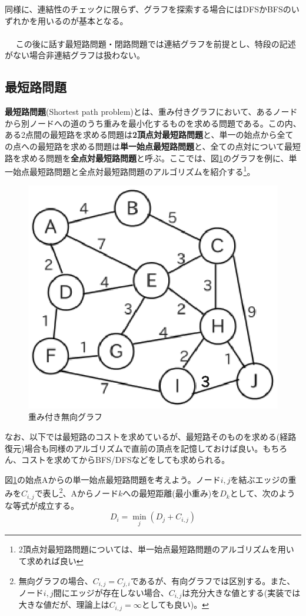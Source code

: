 同様に、連結性のチェックに限らず、グラフを探索する場合にはDFSかBFSのいずれかを用いるのが基本となる。
\\ \\　
この後に話す最短路問題・閉路問題では連結グラフを前提とし、特段の記述がない場合非連結グラフは扱わない。

\subsection{最短路問題}
\textbf{最短路問題}(Shortest path problem)とは、重み付きグラフにおいて、あるノードから別ノードへの道のうち重みを最小化するものを求める問題である。この内、ある2点間の最短路を求める問題は\textbf{2頂点対最短路問題}と、単一の始点から全ての点への最短路を求める問題は\textbf{単一始点最短路問題}と、全ての点対について最短路を求める問題を\textbf{全点対最短路問題}と呼ぶ。ここでは、図\ref{shortest}のグラフを例に、単一始点最短路問題と全点対最短路問題のアルゴリズムを紹介する\footnote{2頂点対最短路問題については、単一始点最短路問題のアルゴリズムを用いて求めれば良い}。

\begin{figure}[htb]
\centering
\includegraphics[width=0.5\linewidth,keepaspectratio]{fig13_6.eps}
\caption{重み付き無向グラフ}\label{shortest}
\end{figure}

なお、以下では最短路のコストを求めているが、最短路そのものを求める(経路復元)場合も同様のアルゴリズムで直前の頂点を記憶しておけば良い。もちろん、コストを求めてからBFS/DFSなどをしても求められる。

図\ref{shortest}の始点Aからの単一始点最短路問題を考えよう。ノード$i,j$を結ぶエッジの重みを$C_{i,j}$で表し\footnote{無向グラフの場合、$C_{i,j}=C_{j,i}$であるが、有向グラフでは区別する。また、ノード$i,j$間にエッジが存在しない場合、$C_{i,j}$は充分大きな値とする(実装では大きな値だが、理論上は$C_{i,j}=\infty$としても良い)。}、Aからノード$k$への最短距離(最小重み)を$D_k$として、次のような等式が成立する。
\begin{equation}
D_i=\min_j\left(D_j+C_{i,j}\right) \label{bellman}
\end{equation}

